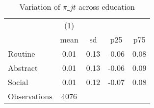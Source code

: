 \begin{table}[htbp]\centering
\def\sym#1{\ifmmode^{#1}\else\(^{#1}\)\fi}
\caption{Variation of $\pi\_{jt}$ across education}
\begin{tabular}{l*{1}{cccc}}
\toprule
                    &\multicolumn{1}{c}{(1)}&            &            &            \\
                    &        mean&          sd&         p25&         p75\\
\midrule
Routine             &        0.01&        0.13&       -0.06&        0.08\\
Abstract            &        0.01&        0.13&       -0.06&        0.09\\
Social              &        0.01&        0.12&       -0.07&        0.08\\
\midrule
Observations        &        4076&            &            &            \\
\bottomrule
\end{tabular}
\end{table}
